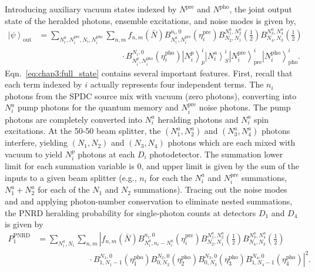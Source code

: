 \documentclass[aps,twocolumn,secnumarabic,amsmath,amssymb,pra,groupedaddress,
showpacs, showkeys]{revtex4-1}
\newcommand{\ket}[1]{\left|#1\right\rangle}
\newcommand{\pna}[1]{\left(#1\right)}
\begin{document}
Introducing auxiliary vacuum states indexed by $N^{\textrm{pre}}$ and
$N^{\textrm{pho}}$, the joint output state of the heralded photons, ensemble
excitations, and noise modes is given by,
\begin{align}
	\ket{\psi}_{\textrm{out}} &=\sum_{N_i^a,N_i^{\textrm{pre}},N_i,N_i^{\textrm{pho}}}
	\sum_{n,m} 
	f_{n,m}\pna{\bar{N}}
	B_{N_i^a,N_i^{\textrm{pre}}}^{n_i,0}\pna{\eta_i^{\textrm{pre}}}  
	B_{N_2,N_1}^{N_1^a,N_2^a}\pna{\frac{1}{2}}  
	B_{N_4,N_3}^{N_3^a,N_4^a}\pna{\frac{1}{2}}\nonumber \\
	& \qquad \qquad \qquad \qquad \qquad
	\cdot B_{N_i^p,N_i^{\textrm{pho}}}^{N_i,0}\pna{\eta_i^{\textrm{pho}}}  
	\ket{N_i^p}^i_p
	\ket{N_i^a}^i_S 
	\ket{N_i^{\textrm{pre}}}^i_{\textrm{pre}}
	\ket{N_i^{\textrm{pho}}}^i_{\textrm{pho}}. \label{eq:chap3:full_state}
\end{align}
Eqn.~\ref{eq:chap3:full_state} contains several important features. First,
recall that each term indexed by $i$ actually represents four independent
terms. The $n_i$ photons from the SPDC source mix with vacuum (zero photons),
converting into $N^a_i$ pump photons for the quantum memory and
$N_i^{\textrm{pre}}$ noise photons. The pump photons are completely converted
into $N^a_i$ heralding photons and $N^a_i$ spin excitations. At the 50-50 beam
splitter, the $\pna{N^a_1,N^a_2}$ and $\pna{N^a_3,N^a_4}$ photons interfere,
yielding $\pna{N_1,N_2}$ and $\pna{N_3,N_4}$ photons which are each mixed with
vacuum to yield $N^p_i$ photons at each $D_i$ photodetector. The summation
lower limit for each summation variable is 0, and upper limit is given by the
sum of the inputs to a given beam splitter (e.g., $n_i$ for each the $N^a_i$
and $N_i^{\textrm{pre}}$ summations, $N^a_1+N^a_2$ for each of the $N_1$ and
$N_2$ summations). Tracing out the noise modes and and applying photon-number
conservation to eliminate nested summations, the PNRD heralding probability for
single-photon counts at detectors $D_1$ and $D_4$ is given by
\begin{align}
	P_{1}^{\textrm{PNRD}}&=\sum_{N_i^a,N_i}\sum_{n,m}
	\left| f_{n,m}\pna{\bar{N}}
	B_{N_i^a,n_i-N_i^a}^{n_i,0}\pna{\eta_i^{\textrm{pre}}}
	B_{N_2,N_1}^{N_1^a,N_2^a}\pna{\frac{1}{2}}  
	B_{N_4,N_3}^{N_3^a,N_4^a}\pna{\frac{1}{2}} \right. \nonumber \\
	& \qquad \qquad \qquad\left.~\cdot B_{1,N_1-1}^{N_1,0}\pna{\eta_1^{\textrm{pho}}} 
	B_{0,N_2}^{N_2,0}\pna{\eta_2^{\textrm{pho}}} 
	B_{0,N_3}^{N_3,0}\pna{\eta_3^{\textrm{pho}}} 
	B_{1,N_4-1}^{N_4,0}\pna{\eta_4^{\textrm{pho}}} \right|^2. 
\end{align}
\end{document}
